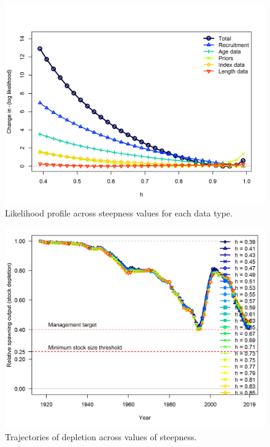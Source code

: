 \documentclass[12pt,]{article}
\begin{document}
\begin{figure}
\centering
\includegraphics{Figures/profile_h_like.png}
\caption{Likelihood profile across steepness values for each data type.
\label{fig:profile_h_like}}
\end{figure}

\FloatBarrier 

\begin{figure}
\centering
\includegraphics{Figures/profile_h_depl.png}
\caption{Trajectories of depletion across values of steepness.
\label{fig:profile_h_depl}}
\end{figure}

\FloatBarrier
\end{document}
